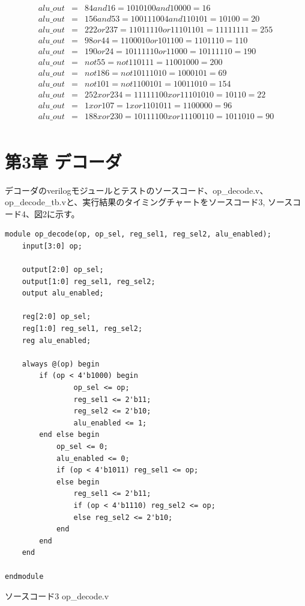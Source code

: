 \documentclass[12pt]{jreport}
\begin{document}
\begin{itemize}
\begin{eqnarray*}
                alu\_out &=& 84 and 16 = 1010100 and 10000 = 16\\
                alu\_out &=& 156 and 53 = 100111004 and 110101 = 10100 = 20\\
                alu\_out &=& 222 or 237 = 11011110 or 11101101 = 11111111 = 255\\
                alu\_out &=& 98 or 44 = 1100010 or 101100 = 1101110 = 110\\
                alu\_out &=& 190 or 24 = 10111110 or 11000 = 10111110 = 190\\
                alu\_out &=& not 55 = not 110111 = 11001000 = 200\\
                alu\_out &=& not 186 = not  10111010 = 1000101 = 69\\
                alu\_out &=& not 101 = not 1100101 = 10011010 = 154\\
                alu\_out &=& 252 xor 234 = 11111100 xor 11101010 = 10110 = 22\\
                alu\_out &=& 1 xor 107 = 1 xor 1101011 = 1100000 = 96\\
                alu\_out &=& 188 xor 230 = 10111100 xor 11100110 = 1011010 = 90\\
            \end{eqnarray*}

        \end{itemize}

    \chapter*{第3章 デコーダ}
        デコーダのverilogモジュールとテストのソースコード、op\_decode.v、op\_decode\_tb.vと、実行結果のタイミングチャートをソースコード3, ソースコード4、図2に示す。
        \begin{center}
            \begin{lstlisting}[basicstyle=\ttfamily\footnotesize, frame=single]
module op_decode(op, op_sel, reg_sel1, reg_sel2, alu_enabled);
    input[3:0] op;
    
    output[2:0] op_sel;
    output[1:0] reg_sel1, reg_sel2;
    output alu_enabled;
    
    reg[2:0] op_sel;
    reg[1:0] reg_sel1, reg_sel2;
    reg alu_enabled;
    
    always @(op) begin
        if (op < 4'b1000) begin
                op_sel <= op;
                reg_sel1 <= 2'b11;
                reg_sel2 <= 2'b10;
                alu_enabled <= 1;
        end else begin
            op_sel <= 0;
            alu_enabled <= 0;
            if (op < 4'b1011) reg_sel1 <= op;
            else begin
                reg_sel1 <= 2'b11;
                if (op < 4'b1110) reg_sel2 <= op;
                else reg_sel2 <= 2'b10;
            end
        end
    end
    
endmodule
            \end{lstlisting}
            ソースコード3 op\_decode.v
        \end{center}
        \newpage
\end{document}
